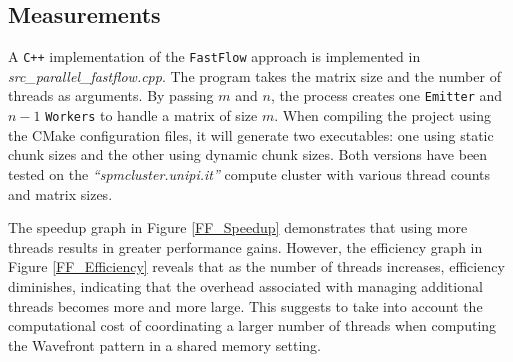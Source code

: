 \subsection*{Measurements}
A \texttt{C++} implementation of the \texttt{FastFlow} approach is implemented in \textit{src\_parallel\_fastflow.cpp}. The program takes the matrix size and the number of threads as arguments. By passing $m$ and $n$, the process creates one \texttt{Emitter} and $n - 1$ \texttt{Workers} to handle a matrix of size $m$. When compiling the project using the CMake configuration files, it will generate two executables: one using static chunk sizes and the other using dynamic chunk sizes. Both versions have been tested on the \textit{``spmcluster.unipi.it''} compute cluster with various thread counts and matrix sizes. 
\par 
The speedup graph in Figure \ref{FF_Speedup} demonstrates that using more threads results in greater performance gains. However, the efficiency graph in Figure \ref{FF_Efficiency} reveals that as the number of threads increases, efficiency diminishes, indicating that the overhead associated with managing additional threads becomes more and more large. This suggests to take into account the computational cost of coordinating a larger number of threads when computing the Wavefront pattern in a shared memory setting.

